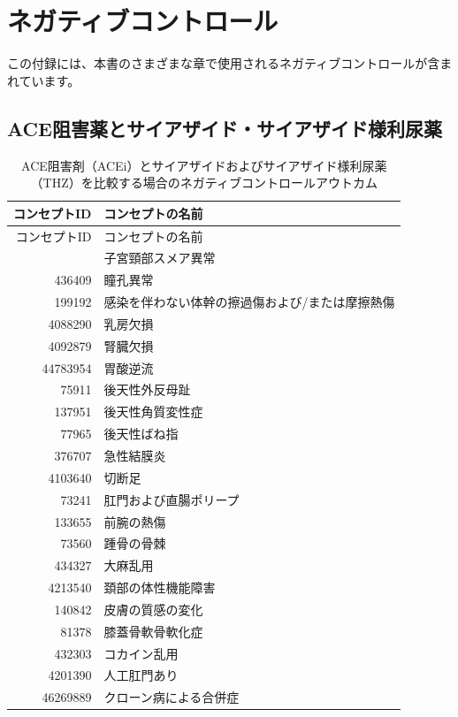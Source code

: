 \documentclass[
  11pt]{book}
\theoremstyle{definition}
\theoremstyle{definition}
\theoremstyle{definition}
\theoremstyle{definition}
\theoremstyle{remark}
\begin{document}
\chapter{ネガティブコントロール}\label{NegativeControlsAppendix}

この付録には、本書のさまざまな章で使用されるネガティブコントロールが含まれています。

\section{ACE阻害薬とサイアザイド・サイアザイド様利尿薬}\label{AceiThzNsc}

\begin{longtable}[]{@{}rl@{}}
\caption{\label{tab:AceiThzNsc} ACE阻害剤（ACEi）とサイアザイドおよびサイアザイド様利尿薬（THZ）を比較する場合のネガティブコントロールアウトカム}\tabularnewline
\toprule\noalign{}
コンセプトID & コンセプトの名前 \\
\midrule\noalign{}
\endfirsthead
\toprule\noalign{}
コンセプトID & コンセプトの名前 \\
\midrule\noalign{}
\endhead
\bottomrule\noalign{}
\endlastfoot
434165 & 子宮頸部スメア異常 \\
436409 & 瞳孔異常 \\
199192 & 感染を伴わない体幹の擦過傷および/または摩擦熱傷 \\
4088290 & 乳房欠損 \\
4092879 & 腎臓欠損 \\
44783954 & 胃酸逆流 \\
75911 & 後天性外反母趾 \\
137951 & 後天性角質変性症 \\
77965 & 後天性ばね指 \\
376707 & 急性結膜炎 \\
4103640 & 切断足 \\
73241 & 肛門および直腸ポリープ \\
133655 & 前腕の熱傷 \\
73560 & 踵骨の骨棘 \\
434327 & 大麻乱用 \\
4213540 & 頚部の体性機能障害 \\
140842 & 皮膚の質感の変化 \\
81378 & 膝蓋骨軟骨軟化症 \\
432303 & コカイン乱用 \\
4201390 & 人工肛門あり \\
46269889 & クローン病による合併症 \\

\end{longtable}
\end{document}
